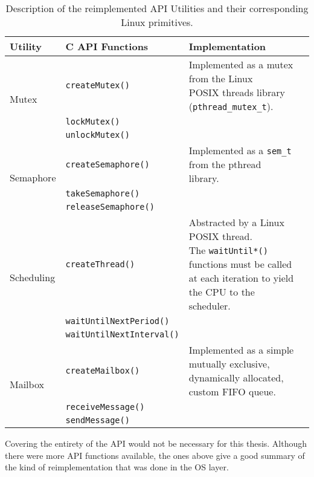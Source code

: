 {\begin{table}[htbp]
	\vspace{12pt}
	\centering
	\begin{tabularx}{\linewidth}{l l X}
		\toprule
		{\bfseries Utility} & \textbf{C API Functions} & \textbf{Implementation}\\
		\midrule
		\multirow{3}{*}{Mutex}  & \texttt{createMutex()}  & \multirowcell{3}[0pt][l]{Implemented as a mutex from the Linux\\ POSIX threads library (\texttt{pthread_mutex_t}).}\\								
		&\texttt{lockMutex()}&\\
		&\texttt{unlockMutex()}&\\
		\midrule
		\multirow{3}{*}{Semaphore}  & \texttt{createSemaphore()}  & \multirowcell{3}[0pt][l]{Implemented as a \texttt{sem_t} from the pthread\\ library.}\\								
		&\texttt{takeSemaphore()}&\\
		&\texttt{releaseSemaphore()}&\\
		\midrule
		\multirow{3}{*}{Scheduling} & \texttt{createThread()}  & \multirowcell{3}[0pt][l]{Abstracted by a Linux POSIX thread.\\ The \texttt{waitUntil*()} functions must be called\\ at each iteration to yield the CPU to the\\ scheduler.}\\
		&\texttt{waitUntilNextPeriod()}&\\
		&\texttt{waitUntilNextInterval()}&\\
		\midrule
		\multirow{3}{*}{Mailbox} & \texttt{createMailbox()}  & \multirowcell{3}[0pt][l]{Implemented as a simple mutually exclusive,\\ dynamically allocated, custom FIFO queue.}\\
		&\texttt{receiveMessage()}&\\
		&\texttt{sendMessage()}&\\
		\bottomrule
	\end{tabularx}
	\caption{Description of the reimplemented API Utilities and their corresponding Linux primitives.}
	\label{tab:does-api}
\end{table}
Covering the entirety of the API would not be necessary for this thesis. Although there were more API functions available, the ones above give a good summary of the kind of reimplementation that was done in the OS layer.

}
